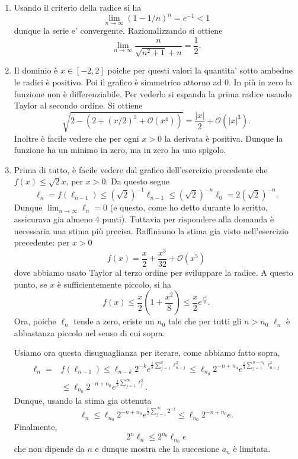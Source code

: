 \documentclass{report}
\begin{document}
\begin{enumerate}
A questo punto si puo concludere: se $q>3$ da quanto visto segue che
\[
\left|e-\frac pq \right|\geq \left|\frac pq-\sum_{n=0}^q\frac
1{n!}\right|-\left| \sum_{n=q+1}^\infty\frac 1{n!}\right|\geq
\frac 1{q!}-\frac 1{q!q}>0
\]
Dunque $e$ non puo mai essere uguale ad un numero razionale a meno che
il denominatore non sia inferiore a $3$, ma 
\[
|e-\frac 83|=|e- (1+1+\frac 12+\frac 16)|\leq \frac 1{3!3}=\frac 1{18}
\]
quindi $e$ non puo essere ne $3$ ne $8/3$ ne altro numero razionale
con denominatore minore di $4$, e quindi non puo essere alcun numero
razione, cio\`e $e$ \`e un numero irrazionale. (Meditate gente, meditate)
\item Usando il criterio della radice si ha
\[
\lim_{n\to\infty}(1-1/n)^n=e^{-1}<1
\]
dunque la serie e' convergente.
Razionalizzando si ottiene
\[
\lim_{n\to\infty}\frac{n}{\sqrt{n^2+1}+n}=\frac 12.
\]
\item Il dominio \`e $x\in[-2,2]$ poiche per questi valori la
quantita' sotto ambedue le radici \`e positivo. Poi il grafico \`e
simmetrico attorno ad $0$. In pi\`u in zero la funzione non \`e
differenziabile. Per vederlo si espanda la prima radice usando Taylor
al secondo ordine. Si ottiene
\[
\sqrt{2-(2+(x/2)^2+{\mathcal O}(x^4))}=\frac{|x|}2+{\mathcal
O}(|x|^3).
\] 
Inoltre \`e facile vedere che per ogni $x> 0$ la derivata \`e
positiva. Dunque la funzione ha un minimo in zero, ma in zero ha uno
spigolo. 
\item Prima di tutto, \`e facile vedere dal grafico dell'esercizio
precedente che $f(x)\leq\sqrt2 x$, per $x>0$. Da questo segue
\[
\ell_{n}=f(\ell_{n-1})\leq(\sqrt 2)^{-1}\ell_{n-1}\leq (\sqrt 2)^{-n}\ell_0=
2(\sqrt 2)^{-n} .
\]
Dunque $\lim_{n\to\infty}\ell_n=0$ (e questo, come ho detto durante lo
scritto, assicurava gia almeno 4 punti).
Tuttavia per rispondere alla domanda \`e necessaria una stima pi\`u
precisa. Raffiniamo la stima gia visto nell'esercizio precedente: per
$x>0$
\[
f(x)= \frac x2 +\frac {x^3}{32}+{\mathcal O}(x^5)
\]
dove abbiamo usato Taylor al terzo ordine per sviluppare la radice.
A questo punto, se $x$ \`e sufficientemente piccolo, si ha
\[
f(x)\leq \frac x2(1+\frac {x^2}8)\leq \frac x2 e^{\frac{x^2}8}.
\]
Ora, poiche $\ell_n$ tende a zero, eriste un $n_0$ tale che per tutti
gli $n>n_0$ $\ell_n$ \`e abbastanza piccolo nel senso di cui sopra.

Usiamo ora questa disuguaglianza per iterare, come abbiamo fatto sopra,
\[
\begin{split}
\ell_n=&f(\ell_{n-1})\leq \ell_{n-k}2^{-k}e^{\frac
18\sum_{j=1}^k\ell_{n-j}^2}\leq \ell_{n_0}2^{-n+n_0}e^{\frac
14\sum_{j=1}^{n-n_0}\ell_{n-j}^2}\\
&\leq \ell_{n_0}2^{-n+n_0}e^{\frac
18\sum_{j=1}^{\infty}\ell_{j}^2}.
\end{split}
\]
Dunque, usando la stima gia ottenuta 
\[
\ell_n\leq \ell_{n_0}2^{-n+n_0}e^{\frac
12\sum_{j=1}^{\infty}2^{-j}}\leq \ell_{n_0}2^{-n+n_0}e.
\]
Finalmente,
\[
2^n\ell_n\leq 2^{n_0}\ell_{n_0}e
\]
che non dipende da $n$ e dunque mostra che la succesione $a_n$ \`e
limitata.


\end{enumerate}
\end{document}
